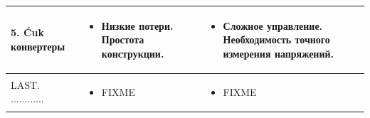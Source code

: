 \begin{table}[h!]
\begin{tabularx}{1.1\linewidth}{|X|X|X|}

        5. {\'C}uk конвертеры & 
        \begin{itemize}
            \item Низкие потери. Простота конструкции.
        \end{itemize} & 
        \begin{itemize}
            \item Сложное управление. Необходимость точного измерения напряжений.
        \end{itemize} \\
        \hline

        LAST. ............ & 
        \begin{itemize}
            \item FIXME
        \end{itemize} & 
        \begin{itemize}
            \item FIXME
        \end{itemize} \\
        \hline
    \end{tabularx}
\end{table}

